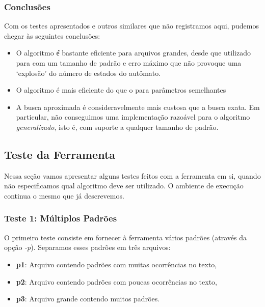\documentclass[]{article}
\begin{document}
\subsubsection{Conclusões}
Com os testes apresentados e outros similares que não registramos aqui, pudemos chegar às seguintes conclusões:

\begin{itemize}
	\item O algoritmo \U é bastante eficiente para arquivos grandes, desde que utilizado para com um tamanho de padrão e erro máximo que não provoque uma `explosão' do número de estados do autômato.

	\item O algoritmo \W é mais eficiente do que o \SE para parâmetros semelhantes

	\item A busca aproximada é consideravelmente mais custosa que a busca exata. Em particular, não conseguimos uma implementação razoável para o algoritmo \W \textit{generalizado}, isto é, com suporte a qualquer tamanho de padrão.
\end{itemize}


\subsection{Teste da Ferramenta}

Nessa seção vamos apresentar alguns testes feitos com a ferramenta em si, quando não especificamos qual algoritmo deve ser utilizado. O ambiente de execução continua o mesmo que já descrevemos.

\subsubsection{Teste 1: Múltiplos Padrões}

O primeiro teste consiste em fornecer à ferramenta vários padrões (através da opção \textit{-p}). Separamos esses padrões em três arquivos: 
	\begin{itemize}
		\item \textbf{p1}: Arquivo contendo padrões com muitas ocorrências no texto,
		\item \textbf{p2}: Arquivo contendo padrões com poucas ocorrências no texto,
		\item \textbf{p3}: Arquivo grande contendo muitos padrões.
	\end{itemize}
\end{document}
